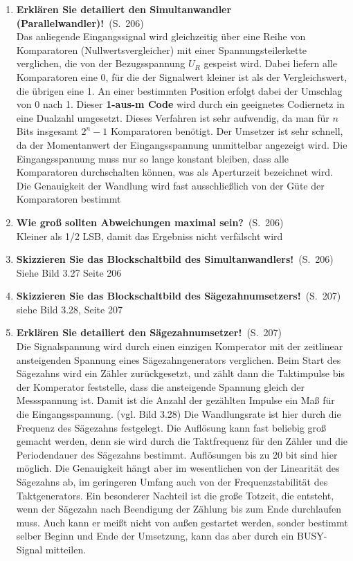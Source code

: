\documentclass[a4paper,12pt]{article}
\newcommand{\question}[3]{\pagebreak[3]\item {\textbf{#1?}}\ (S.\ #2)#3}
\newcommand{\statement}[3]{\pagebreak[3]\item {\textbf{#1!}}\ (S.\ #2)#3}
\newcommand{\normaltext}[1]{\\#1}
\newcommand{\page}[1]{#1}
\newcommand{\important}[1]{\textbf{#1}}
\begin{document}
\begin{enumerate}
  \statement{Erklären Sie detailiert den Simultanwandler (Parallelwandler)}{\page{206}}
  {
    \normaltext{Das anliegende Eingangssignal wird gleichzeitig über eine Reihe von Komparatoren
                (Nullwertsvergleicher) mit einer Spannungsteilerkette verglichen, die von der
                Bezugsspannung $U_R$ gespeist wird. Dabei liefern alle Komparatoren eine 0,
                für die der Signalwert kleiner ist als der Vergleichswert, die übrigen eine 1.
                An einer bestimmten Position erfolgt dabei der Umschlag von 0 nach 1. Dieser
                \important{1-aus-m Code} wird durch ein geeignetes Codiernetz in eine Dualzahl
                umgesetzt. Dieses Verfahren ist sehr aufwendig, da man für $n$ Bits insgesamt
                $2^n - 1$ Komparatoren benötigt. Der Umsetzer ist sehr schnell, da der
                Momentanwert der Eingangsspannung unmittelbar angezeigt wird. Die Eingangsspannung
                muss nur so lange konstant bleiben, dass alle Komparatoren durchschalten können,
                was als Aperturzeit bezeichnet wird. Die Genauigkeit der Wandlung wird fast
                ausschließlich von der Güte der Komparatoren bestimmt}
  }

  \question{Wie groß sollten Abweichungen maximal sein}{\page{206}}
  {
    \normaltext{Kleiner als 1/2 LSB, damit das Ergebniss nicht verfälscht wird}
  }

  \statement{Skizzieren Sie das Blockschaltbild des Simultanwandlers} {\page{206}}
  {
    \normaltext{Siehe Bild 3.27 Seite 206}
  }

  \statement{Skizzieren Sie das Blockschaltbild des Sägezahnumsetzers}{\page{207}}
  {
    \normaltext{siehe Bild 3.28, Seite 207}
  }

  \statement{Erklären Sie detailiert den Sägezahnumsetzer}{\page{207}}
  {
    \normaltext{Die Signalspannung wird durch einen einzigen Komperator mit der zeitlinear 
                ansteigenden Spannung eines Sägezahngenerators verglichen. Beim Start des Sägezahns wird
                ein Zähler zurückgesetzt, und zählt dann die Taktimpulse bis der Komperator feststelle,
                dass die ansteigende Spannung gleich der Messspannung ist. Damit ist die Anzahl der 
                gezählten Impulse ein Maß für die Eingangsspannung. (vgl. Bild 3.28)
                Die Wandlungsrate ist hier durch die Frequenz des Sägezahns festgelegt. Die Auflösung kann
                fast beliebig groß gemacht werden, denn sie wird durch die Taktfrequenz für den Zähler und
                die Periodendauer des Sägezahns bestimmt. Auflösungen bis zu 20 bit sind hier möglich. Die
                Genauigkeit hängt aber im wesentlichen von der Linearität des Sägezahns ab, im geringeren
                Umfang auch von der Frequenzstabilität des Taktgenerators. Ein besonderer Nachteil ist die
                große Totzeit, die entsteht, wenn der Sägezahn nach Beendigung der Zählung bis zum Ende
                durchlaufen muss. Auch kann er meißt nicht von außen gestartet werden, sonder bestimmt selber
                Beginn und Ende der Umsetzung, kann das aber durch ein BUSY-Signal mitteilen.}
  }


\end{enumerate}
\end{document}
